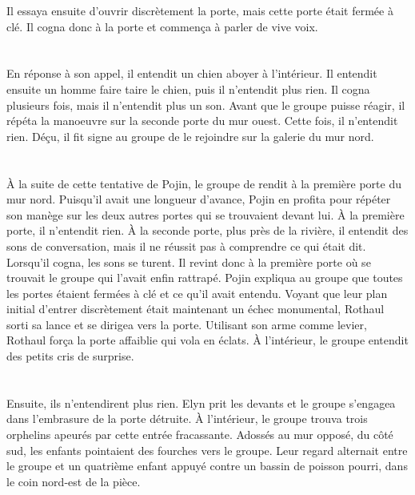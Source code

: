 \documentclass[main.tex]{subfiles}
\begin{document}
    Il essaya ensuite d'ouvrir discrètement la porte, mais cette porte était fermée à clé.
    Il cogna donc à la porte et commença à parler de vive voix.\\
    \\
    \\
    En réponse à son appel, il entendit un chien aboyer à l'intérieur.
    Il entendit ensuite un homme faire taire le chien, puis il n'entendit plus rien.
    Il cogna plusieurs fois, mais il n'entendit plus un son.
    Avant que le groupe puisse réagir, il répéta la manoeuvre sur la seconde porte du mur ouest.
    Cette fois, il n'entendit rien.
    Déçu, il fit signe au groupe de le rejoindre sur la galerie du mur nord.\\
    \\
    \\
    À la suite de cette tentative de Pojin, le groupe de rendit à la première porte du mur nord.
    Puisqu'il avait une longueur d'avance, Pojin en profita pour répéter son manège sur les deux autres portes qui se trouvaient devant lui.
    À la première porte, il n'entendit rien.
    À la seconde porte, plus près de la rivière, il entendit des sons de conversation, mais il ne réussit pas à comprendre ce qui était dit.
    Lorsqu'il cogna, les sons se turent.
    Il revint donc à la première porte où se trouvait le groupe qui l'avait enfin rattrapé.
    Pojin expliqua au groupe que toutes les portes étaient fermées à clé et ce qu'il avait entendu.
    Voyant que leur plan initial d'entrer discrètement était maintenant un échec monumental, Rothaul sorti sa lance et se dirigea vers la porte.
    Utilisant son arme comme levier, Rothaul força la porte affaiblie qui vola en éclats.
    À l'intérieur, le groupe entendit des petits cris de surprise.\\
    \\
    \\
    Ensuite, ils n'entendirent plus rien.
    Elyn prit les devants et le groupe s'engagea dans l'embrasure de la porte détruite.
    À l'intérieur, le groupe trouva trois orphelins apeurés par cette entrée fracassante.
    Adossés au mur opposé, du côté sud, les enfants pointaient des fourches vers le groupe.
    Leur regard alternait entre le groupe et un quatrième enfant appuyé contre un bassin de poisson pourri, dans le coin nord-est de la pièce.
\end{document}
